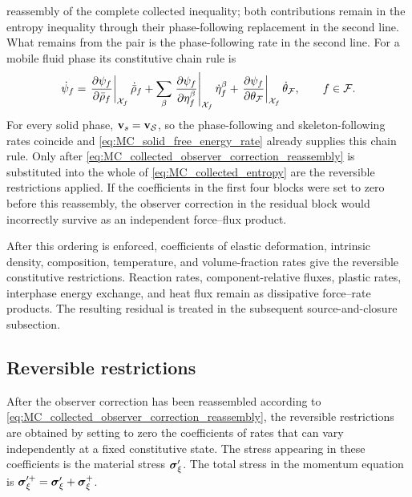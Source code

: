 reassembly of the complete collected inequality; both contributions remain
in the entropy inequality through their phase-following replacement in the
second line.  What remains from the pair is the
phase-following rate in the second line.  For a mobile fluid phase its
constitutive chain rule is
%
\begin{equation}
	\dot{\psi}_f
	=
	\left.
	\frac{\partial \psi_f}{\partial \bar\rho_f}
	\right\vert_{\mathcal{X}_f}
	\dot{\bar\rho}_f
	+
	\sum_\beta
	\left.
	\frac{\partial \psi_f}{\partial \eta_f^\beta}
	\right\vert_{\mathcal{X}_f}
	\dot{\eta}_f^\beta
	+
	\left.
	\frac{\partial \psi_f}{\partial \theta_{\mathcal{F}}}
	\right\vert_{\mathcal{X}_f}
	\dot{\theta}_{\mathcal{F}},
	\qquad
	f\in\mathcal{F}.
	\label{eq:MC_fluid_phase_following_free_energy_chain_rule}
\end{equation}
%
For every solid phase,
\(\mathbf{v}_s=\mathbf{v}_{\mathcal{S}}\), so the phase-following and skeleton-following
rates coincide and \eqref{eq:MC_solid_free_energy_rate} already supplies this
chain rule.  Only after
\eqref{eq:MC_collected_observer_correction_reassembly} is substituted into the
whole of \eqref{eq:MC_collected_entropy} are the reversible restrictions
applied.  If the coefficients in the first four blocks were set to zero before
this reassembly, the observer correction in the residual block would
incorrectly survive as an independent force--flux product.

After this ordering is enforced, coefficients of elastic deformation,
intrinsic density, composition, temperature, and volume-fraction rates give
the reversible constitutive restrictions.  Reaction rates, component-relative
fluxes, plastic rates, interphase energy exchange, and heat flux remain as
dissipative force--rate products.  The resulting residual is treated in
the subsequent source-and-closure subsection.

\subsection{Reversible restrictions}
\label{sec:MC_reversible_restrictions}

After the observer correction has been reassembled according to
\eqref{eq:MC_collected_observer_correction_reassembly}, the reversible
restrictions are obtained by setting to zero the coefficients of rates that
can vary independently at a fixed constitutive state.  The stress
appearing in these coefficients is the material stress
\(\boldsymbol{\sigma}_\xi'\).  The total stress in the momentum equation is
\(\boldsymbol{\sigma}_\xi^{\prime+}=\boldsymbol{\sigma}_\xi'+\boldsymbol{\sigma}_\xi^+\).

